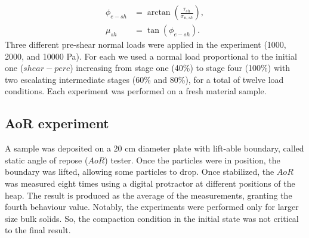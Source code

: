 \documentclass[review]{elsarticle}
\begin{document}
\begin{appendix}
\begin{equation}
\begin{aligned}
\phi_{e-sh} &= \arctan \left(\frac{\tau_{sh}}{\sigma_{n,sh}} \right) ,\\
\mu_{sh} &= \tan(\phi_{e-sh}) .
\end{aligned}
 \label{eq:phi_s}
\end{equation}
Three different pre-shear normal loads were applied in the experiment
(1000, 2000, and 10000 Pa).
For each we used a normal load proportional to the initial one ($shear-perc$) increasing from stage one (40\%) 
to stage four (100\%) with two escalating intermediate stages (60\% and 80\%),
for a total of twelve load conditions.
Each experiment was performed on a fresh material sample. \\

\subsection{AoR experiment}
\label{subsec:aorexperiment}
A sample was deposited on a 20 cm diameter plate with lift-able boundary, called
static angle of repose ($AoR$) tester.
Once the particles were in position, the boundary was lifted, allowing some particles to drop. 
Once stabilized, the $AoR$ was measured eight times using a digital protractor at different positions of the heap. 
The result is produced as the average of the measurements, granting the fourth
behaviour value.
Notably, the experiments were performed only for larger size bulk solids. 
So, the compaction condition in the initial state was not critical to the final result.

\end{appendix}

\renewcommand\thefigure{\arabic{figure}}
\end{document}
